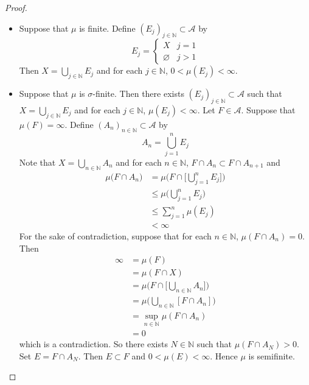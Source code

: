 \documentclass[12pt]{amsart}
\theoremstyle{definition}
\newcommand{\sig}{\sigma}
\newcommand{\N}{\mathbb{N}}
\newcommand{\MA}{\mathcal{A}}
\begin{document}
	\begin{proof}\
		\begin{itemize}
			\item Suppose that $\mu$ is finite. Define $(E_j)_{j \in \N} \subset \MA$ by 
			\[E_j =
			\begin{cases}
				X & j=1 \\
				\varnothing & j > 1
			\end{cases}
			\]
			Then $X = \bigcup\limits_{j \in \N} E_j$ and for each $j \in \N$, $0 < \mu(E_j) < \infty$.
			\item Suppose that $\mu$ is $\sig$-finite. Then there exists $(E_j)_{j \in \N} \subset \MA$ such that $X = \bigcup\limits_{j \in \N} E_j$
			and for each $j \in \N$, $\mu(E_j) < \infty$. Let $F \in \MA$. Suppose that $\mu(F) = \infty$. Define $(A_n)_{n \in \N} \subset \MA$ by 
			$$A_n = \bigcup_{j=1}^n E_j$$
			Note that $X = \bigcup\limits_{n \in \N} A_n$ and for each $n \in \N$, $F \cap A_n \subset F \cap A_{n+1}$ and 
			\begin{align*}
				\mu \bigg (F \cap A_n \bigg)  
				& = \mu \bigg (F \cap \bigg[ \bigcup_{j=1}^n E_j \bigg] \bigg)  \\
				& \leq \mu \bigg (\bigcup_{j=1}^n E_j \bigg) \\
				& \leq \sum_{j=1}^n \mu(E_j) \\
				& < \infty
			\end{align*}
			For the sake of contradiction, suppose that for each $n \in \N$, $\mu  (F \cap A_n ) = 0$. Then
			\begin{align*}
				\infty 
				& = \mu(F) \\
				& = \mu(F \cap X) \\
				& = \mu\bigg(F \cap \bigg[ \bigcup_{n \in \N} A_n \bigg] \bigg) \\
				& = \mu\bigg(  \bigcup_{n \in \N} [F \cap A_n] \bigg) \\
				& = \sup_{n \in \N} \mu(F \cap A_n) \\
				& = 0
			\end{align*}
			which is a contradiction. So there exists $N \in \N$ such that $\mu  (F \cap A_N ) > 0$. Set $E = F \cap A_N$. Then $E \subset F$ and $0 < \mu(E) < \infty$. Hence $\mu$ is semifinite.
		\end{itemize}
	\end{proof}
\end{document}
